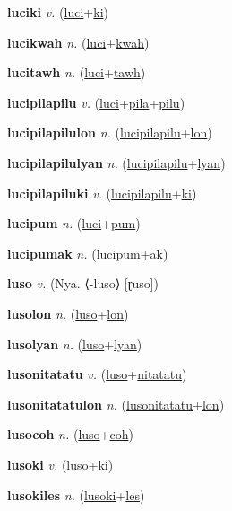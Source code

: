 \textbf{\hypertarget{luciki}{luciki}} \textit{v.} (\hyperlink{luci}{luci}+\allowbreak \hyperlink{ki}{ki})


\textbf{\hypertarget{lucikwah}{lucikwah}} \textit{n.} (\hyperlink{luci}{luci}+\allowbreak \hyperlink{kwah}{kwah})


\textbf{\hypertarget{lucitawh}{lucitawh}} \textit{n.} (\hyperlink{luci}{luci}+\allowbreak \hyperlink{tawh}{tawh})


\textbf{\hypertarget{lucipilapilu}{lucipilapilu}} \textit{v.} (\hyperlink{luci}{luci}+\allowbreak \hyperlink{pila}{pila}+\allowbreak \hyperlink{pilu}{pilu})


\textbf{\hypertarget{lucipilapilulon}{lucipilapilulon}} \textit{n.} (\hyperlink{lucipilapilu}{lucipilapilu}+\allowbreak \hyperlink{lon}{lon})


\textbf{\hypertarget{lucipilapilulyan}{lucipilapilulyan}} \textit{n.} (\hyperlink{lucipilapilu}{lucipilapilu}+\allowbreak \hyperlink{lyan}{lyan})


\textbf{\hypertarget{lucipilapiluki}{lucipilapiluki}} \textit{v.} (\hyperlink{lucipilapilu}{lucipilapilu}+\allowbreak \hyperlink{ki}{ki})


\textbf{\hypertarget{lucipum}{lucipum}} \textit{n.} (\hyperlink{luci}{luci}+\allowbreak \hyperlink{pum}{pum})


\textbf{\hypertarget{lucipumak}{lucipumak}} \textit{n.} (\hyperlink{lucipum}{lucipum}+\allowbreak \hyperlink{ak}{ak})


\textbf{\hypertarget{luso}{luso}} \textit{v.} (Nya. ⟨-luso⟩ [ɽuso])


\textbf{\hypertarget{lusolon}{lusolon}} \textit{n.} (\hyperlink{luso}{luso}+\allowbreak \hyperlink{lon}{lon})


\textbf{\hypertarget{lusolyan}{lusolyan}} \textit{n.} (\hyperlink{luso}{luso}+\allowbreak \hyperlink{lyan}{lyan})


\textbf{\hypertarget{lusonitatatu}{lusonitatatu}} \textit{v.} (\hyperlink{luso}{luso}+\allowbreak \hyperlink{nitatatu}{nitatatu})


\textbf{\hypertarget{lusonitatatulon}{lusonitatatulon}} \textit{n.} (\hyperlink{lusonitatatu}{lusonitatatu}+\allowbreak \hyperlink{lon}{lon})


\textbf{\hypertarget{lusocoh}{lusocoh}} \textit{n.} (\hyperlink{luso}{luso}+\allowbreak \hyperlink{coh}{coh})


\textbf{\hypertarget{lusoki}{lusoki}} \textit{v.} (\hyperlink{luso}{luso}+\allowbreak \hyperlink{ki}{ki})


\textbf{\hypertarget{lusokiles}{lusokiles}} \textit{n.} (\hyperlink{lusoki}{lusoki}+\allowbreak \hyperlink{les}{les})


